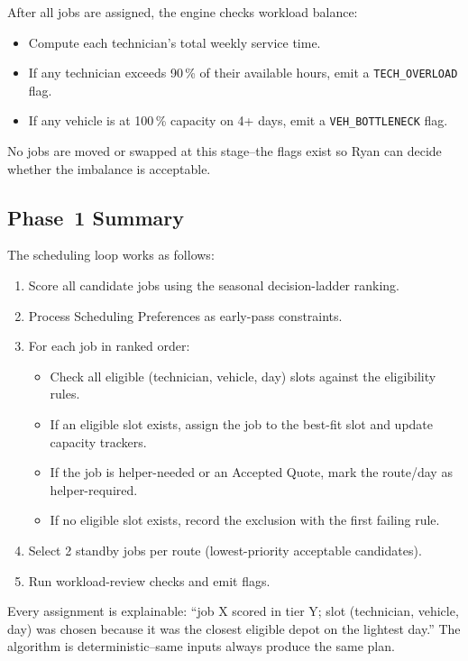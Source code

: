 \documentclass[12pt]{article}
\begin{document}
After all jobs are assigned, the engine checks workload balance:
\begin{itemize}
    \item Compute each technician's total weekly service time.
    \item If any technician exceeds 90\,\% of their available hours, emit a \texttt{TECH\_OVERLOAD} flag.
    \item If any vehicle is at 100\,\% capacity on 4+ days, emit a \texttt{VEH\_BOTTLENECK} flag.
\end{itemize}

No jobs are moved or swapped at this stage--the flags exist so Ryan can decide whether the imbalance is acceptable.

\subsection*{Phase~1 Summary}

The scheduling loop works as follows:
\begin{enumerate}
    \item Score all candidate jobs using the seasonal decision-ladder ranking.
    \item Process Scheduling Preferences as early-pass constraints.
    \item For each job in ranked order:
    \begin{itemize}
        \item Check all eligible (technician, vehicle, day) slots against the eligibility rules.
        \item If an eligible slot exists, assign the job to the best-fit slot and update capacity trackers.
        \item If the job is helper-needed or an Accepted Quote, mark the route/day as helper-required.
        \item If no eligible slot exists, record the exclusion with the first failing rule.
    \end{itemize}
    \item Select 2 standby jobs per route (lowest-priority acceptable candidates).
    \item Run workload-review checks and emit flags.
\end{enumerate}

Every assignment is explainable: ``job X scored in tier Y; slot (technician, vehicle, day) was chosen because it was the closest eligible depot on the lightest day.''
The algorithm is deterministic--same inputs always produce the same plan.
\end{document}
